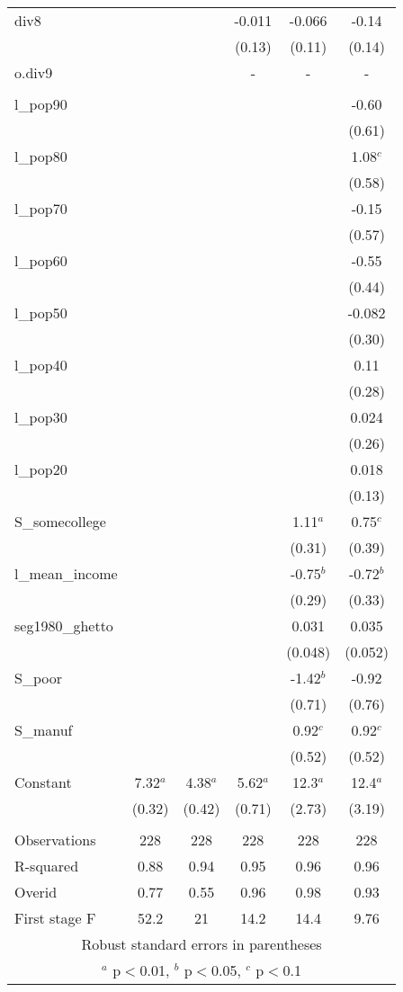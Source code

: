 \documentclass[]{article}
\begin{document}
\begin{tabular}{lccccc}
div8 &  &  & -0.011 & -0.066 & -0.14 \\
 &  &  & (0.13) & (0.11) & (0.14) \\
o.div9 &  &  & - & - & - \\
 &  &  &  &  &  \\
l\_pop90 &  &  &  &  & -0.60 \\
 &  &  &  &  & (0.61) \\
l\_pop80 &  &  &  &  & 1.08$^c$ \\
 &  &  &  &  & (0.58) \\
l\_pop70 &  &  &  &  & -0.15 \\
 &  &  &  &  & (0.57) \\
l\_pop60 &  &  &  &  & -0.55 \\
 &  &  &  &  & (0.44) \\
l\_pop50 &  &  &  &  & -0.082 \\
 &  &  &  &  & (0.30) \\
l\_pop40 &  &  &  &  & 0.11 \\
 &  &  &  &  & (0.28) \\
l\_pop30 &  &  &  &  & 0.024 \\
 &  &  &  &  & (0.26) \\
l\_pop20 &  &  &  &  & 0.018 \\
 &  &  &  &  & (0.13) \\
S\_somecollege &  &  &  & 1.11$^a$ & 0.75$^c$ \\
 &  &  &  & (0.31) & (0.39) \\
l\_mean\_income &  &  &  & -0.75$^b$ & -0.72$^b$ \\
 &  &  &  & (0.29) & (0.33) \\
seg1980\_ghetto &  &  &  & 0.031 & 0.035 \\
 &  &  &  & (0.048) & (0.052) \\
S\_poor &  &  &  & -1.42$^b$ & -0.92 \\
 &  &  &  & (0.71) & (0.76) \\
S\_manuf &  &  &  & 0.92$^c$ & 0.92$^c$ \\
 &  &  &  & (0.52) & (0.52) \\
Constant & 7.32$^a$ & 4.38$^a$ & 5.62$^a$ & 12.3$^a$ & 12.4$^a$ \\
 & (0.32) & (0.42) & (0.71) & (2.73) & (3.19) \\
 &  &  &  &  &  \\
Observations & 228 & 228 & 228 & 228 & 228 \\
R-squared & 0.88 & 0.94 & 0.95 & 0.96 & 0.96 \\
Overid & 0.77 & 0.55 & 0.96 & 0.98 & 0.93 \\
 First stage F & 52.2 & 21 & 14.2 & 14.4 & 9.76 \\ \hline
\multicolumn{6}{c}{ Robust standard errors in parentheses} \\
\multicolumn{6}{c}{ $^a$ p$<$0.01, $^b$ p$<$0.05, $^c$ p$<$0.1} \\
\end{tabular}
\end{document}
